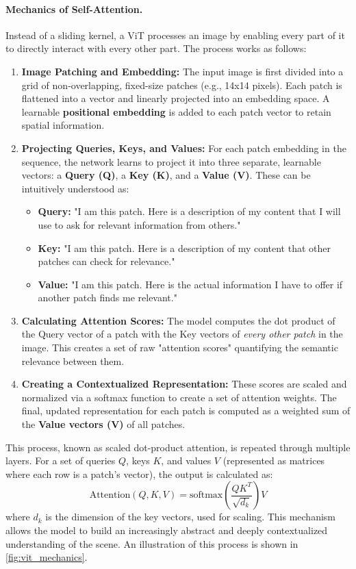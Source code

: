 \paragraph{Mechanics of Self-Attention.} Instead of a sliding kernel, a ViT processes an image by enabling every part of it to directly interact with every other part. The process works as follows:
\begin{enumerate}
\item \textbf{Image Patching and Embedding:} The input image is first divided into a grid of non-overlapping, fixed-size patches (e.g., 14x14 pixels). Each patch is flattened into a vector and linearly projected into an embedding space. A learnable \textbf{positional embedding} is added to each patch vector to retain spatial information.
\item \textbf{Projecting Queries, Keys, and Values:} For each patch embedding in the sequence, the network learns to project it into three separate, learnable vectors: a \textbf{Query (Q)}, a \textbf{Key (K)}, and a \textbf{Value (V)}. These can be intuitively understood as:
\begin{itemize}
\item \textbf{Query:} "I am this patch. Here is a description of my content that I will use to ask for relevant information from others."
\item \textbf{Key:} "I am this patch. Here is a description of my content that other patches can check for relevance."
\item \textbf{Value:} "I am this patch. Here is the actual information I have to offer if another patch finds me relevant."
\end{itemize}
\item \textbf{Calculating Attention Scores:} The model computes the dot product of the Query vector of a patch with the Key vectors of \textit{every other patch} in the image. This creates a set of raw "attention scores" quantifying the semantic relevance between them.
\item \textbf{Creating a Contextualized Representation:} These scores are scaled and normalized via a softmax function to create a set of attention weights. The final, updated representation for each patch is computed as a weighted sum of the \textbf{Value vectors (V)} of all patches.
\end{enumerate}
This process, known as scaled dot-product attention, is repeated through multiple layers. For a set of queries $Q$, keys $K$, and values $V$ (represented as matrices where each row is a patch's vector), the output is calculated as:
\begin{equation}
\text{Attention}(Q, K, V) = \text{softmax}\left(\frac{QK^T}{\sqrt{d_k}}\right)V
\end{equation}
where $d_k$ is the dimension of the key vectors, used for scaling. This mechanism allows the model to build an increasingly abstract and deeply contextualized understanding of the scene.
An illustration of this process is shown in \cref{fig:vit_mechanics}.

